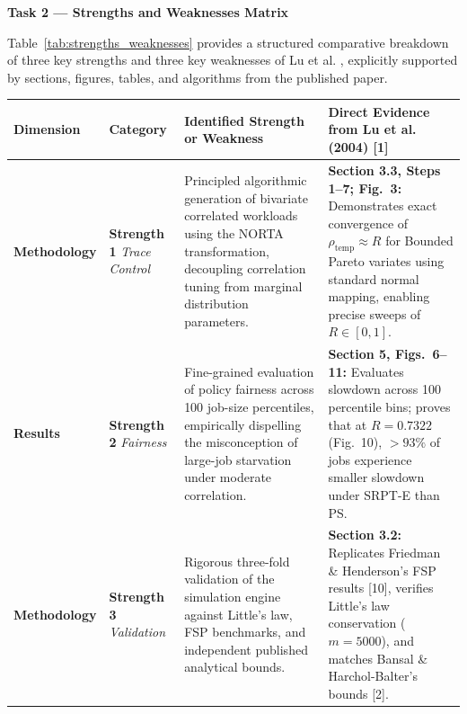 \documentclass[11pt]{article}
\begin{document}
\newpage
{\centering\fontsize{13.5}{16.5}\selectfont\textbf{Task 2 --- Strengths and Weaknesses Matrix}\par}
\vspace{0.5em}

Table~\ref{tab:strengths_weaknesses} provides a structured comparative breakdown of three key strengths and three key weaknesses of Lu et al. , explicitly supported by sections, figures, tables, and algorithms from the published paper.

\vspace{0.5em}
\begin{center}
\small
\renewcommand{\arraystretch}{1.2}
\begin{tabular}{@{}p{2.2cm} p{2.0cm} p{5.6cm} p{5.5cm}@{}}
    \toprule
    \textbf{Dimension} & \textbf{Category} & \textbf{Identified Strength or Weakness} & \textbf{Direct Evidence from Lu et al. (2004) [1]} \\
    \midrule

    \textbf{Methodology} & 
    \textbf{Strength 1} \newline \textit{Trace Control} & 
    Principled algorithmic generation of bivariate correlated workloads using the NORTA transformation, decoupling correlation tuning from marginal distribution parameters. & 
    \textbf{Section 3.3, Steps 1--7; Fig.~3:} Demonstrates exact convergence of $\rho_{\text{temp}} \approx R$ for Bounded Pareto variates using standard normal mapping, enabling precise sweeps of $R \in [0, 1]$. \\
    \addlinespace[0.2em]

    \textbf{Results} & 
    \textbf{Strength 2} \newline \textit{Fairness} & 
    Fine-grained evaluation of policy fairness across 100 job-size percentiles, empirically dispelling the misconception of large-job starvation under moderate correlation. & 
    \textbf{Section 5, Figs.~6--11:} Evaluates slowdown across 100 percentile bins; proves that at $R=0.7322$ (Fig.~10), $>93\%$ of jobs experience smaller slowdown under SRPT-E than PS. \\
    \addlinespace[0.2em]

    \textbf{Methodology} & 
    \textbf{Strength 3} \newline \textit{Validation} & 
    Rigorous three-fold validation of the simulation engine against Little's law, FSP benchmarks, and independent published analytical bounds. & 
    \textbf{Section 3.2:} Replicates Friedman \& Henderson's FSP results [10], verifies Little's law conservation ($m=5000$), and matches Bansal \& Harchol-Balter's bounds [2]. \\
    \midrule


\end{tabular}
\end{center}
\end{document}
